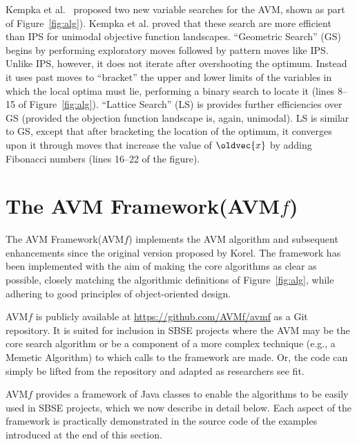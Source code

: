 \documentclass{llncs}
\let\vec\oldvec %
\newcommand{\longname}{AVM Framework\xspace}
\newcommand{\name}{AVM\hspace{-1pt}$f$\xspace}
\newcommand{\repourl}{\url{https://github.com/AVMf/avmf}\xspace}
\newcommand{\inlineheading}[1]{\vspace{1mm} \noindent {\bf #1.}}
\begin{document}
\inlineheading{New Variable Search Algorithms}
Kempka et al.~\cite{Kempka2015} proposed two new variable searches for the AVM, shown as part of Figure~\ref{fig:alg}). Kempka et al. proved that these search are more efficient than IPS for unimodal objective function landscapes. ``Geometric Search'' (GS) begins by performing exploratory moves followed by pattern moves like IPS. Unlike IPS, however, it does not iterate after overshooting the optimum. Instead it uses past moves to  ``bracket'' the upper and lower limits of the variables in which the local optima must lie, performing a binary search to locate it (lines 8--15 of Figure~\ref{fig:alg}). ``Lattice Search'' (LS) is provides further efficiencies over GS (provided the objection function landscape is, again, unimodal). LS is similar to GS, except that after bracketing the \mbox{location} of the optimum, it converges upon it through moves that increase the value of $\vec{x}$ by adding Fibonacci numbers (lines 16--22 of the figure).

\vspace{-1em}
\section{The \longname (\name)}
\vspace{-1ex}
\label{sec:avmf}
The \longname (\name) implements the AVM algorithm and subsequent enhancements since the original version proposed by Korel. The framework has been implemented with the aim of making the core algorithms as clear as possible, closely matching the algorithmic definitions of Figure~\ref{fig:alg}, while adhering to good principles of object-oriented design.

\name is publicly available at \repourl as a Git repository. It is suited for inclusion in SBSE projects where the AVM may be the core search algorithm or be a component of a more complex technique (e.g., a Memetic Algorithm) to which calls to the framework are made. Or, the code can simply be lifted from the repository and adapted as researchers see fit.

\name provides a framework of Java classes to enable the algorithms to be easily used in SBSE projects, which we now describe in detail below. Each aspect of the framework is practically demonstrated in the source code of the examples introduced at the end of this section.
\end{document}
